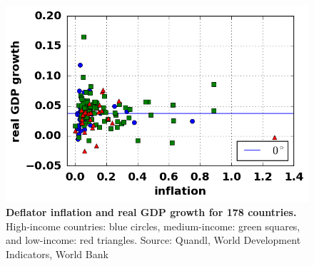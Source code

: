 \begin{figure}[h]
\caption{\label{fig_moneyGDP} \textbf{Deflator inflation and real GDP growth for 178 countries.} High-income countries: blue circles, medium-income: green squares, and low-income: red triangles. {\tiny Source: Quandl, World Development Indicators, World Bank}}
\hspace*{-.5cm}\includegraphics[height = 7.cm]{../png/fig_inflationGDP.png}
\end{figure}